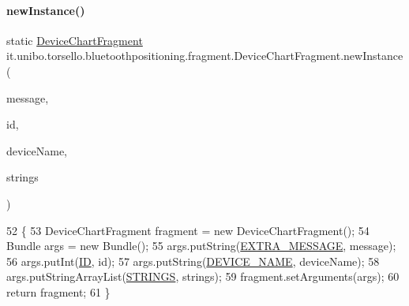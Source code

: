 \paragraph{\texorpdfstring{new\+Instance()}{newInstance()}}
{\footnotesize\ttfamily static \hyperlink{classit_1_1unibo_1_1torsello_1_1bluetoothpositioning_1_1fragment_1_1DeviceChartFragment}{Device\+Chart\+Fragment} it.\+unibo.\+torsello.\+bluetoothpositioning.\+fragment.\+Device\+Chart\+Fragment.\+new\+Instance (\begin{DoxyParamCaption}\item[{String}]{message,  }\item[{int}]{id,  }\item[{String}]{device\+Name,  }\item[{Array\+List$<$ String $>$}]{strings }\end{DoxyParamCaption})\hspace{0.3cm}{\ttfamily [static]}}


\begin{DoxyCode}
52                                                                              \{
53         DeviceChartFragment fragment = \textcolor{keyword}{new} DeviceChartFragment();
54         Bundle args = \textcolor{keyword}{new} Bundle();
55         args.putString(\hyperlink{classit_1_1unibo_1_1torsello_1_1bluetoothpositioning_1_1fragment_1_1DeviceChartFragment_a28ddce9b6c06c183ca8a3717e51d6339_a28ddce9b6c06c183ca8a3717e51d6339}{EXTRA\_MESSAGE}, message);
56         args.putInt(\hyperlink{classit_1_1unibo_1_1torsello_1_1bluetoothpositioning_1_1fragment_1_1DeviceChartFragment_a4f077af11a4bef4240a1fe8e2185c20e_a4f077af11a4bef4240a1fe8e2185c20e}{ID}, \textcolor{keywordtype}{id});
57         args.putString(\hyperlink{classit_1_1unibo_1_1torsello_1_1bluetoothpositioning_1_1fragment_1_1DeviceChartFragment_a9313a4d6f386037e62d95d535b379ab2_a9313a4d6f386037e62d95d535b379ab2}{DEVICE\_NAME}, deviceName);
58         args.putStringArrayList(\hyperlink{classit_1_1unibo_1_1torsello_1_1bluetoothpositioning_1_1fragment_1_1DeviceChartFragment_a2be86b68a5ce90a3ba90b7a214ac47c0_a2be86b68a5ce90a3ba90b7a214ac47c0}{STRINGS}, strings);
59         fragment.setArguments(args);
60         \textcolor{keywordflow}{return} fragment;
61     \}
\end{DoxyCode}
\hypertarget{classit_1_1unibo_1_1torsello_1_1bluetoothpositioning_1_1fragment_1_1DeviceChartFragment_a08829e4742056e3f4ba3561c3de1e3d6_a08829e4742056e3f4ba3561c3de1e3d6}{}\label{classit_1_1unibo_1_1torsello_1_1bluetoothpositioning_1_1fragment_1_1DeviceChartFragment_a08829e4742056e3f4ba3561c3de1e3d6_a08829e4742056e3f4ba3561c3de1e3d6} 
